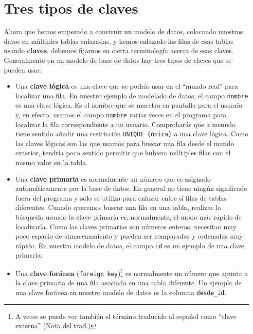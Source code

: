 \section{Tres tipos de claves}

Ahora que hemos empezado a construir un modelo de datos, colocando
nuestros datos en múltiples tablas enlazadas, y hemos enlazado las filas de esas
tablas usando {\bf claves}, debemos fijarnos en cierta terminología
acerca de esas claves. Generalmente en un modelo de base de datos hay
tres tipos de claves que se pueden usar:

\begin{itemize}

\item Una {\bf clave lógica} es una clave que se podría usar en el ``mundo real''
para localizar una fila. En nuestro ejemplo de modelado de datos, el campo
{\tt nombre} es una clave lógica. Es el nombre que se muestra en pantalla para el usuario
y, en efecto, usamos el campo {\tt nombre} varias veces en el programa
para localizar la fila correspondiente a un usuario. Comprobarás que a menudo tiene sentido
añadir una restricción {\tt UNIQUE (única)} a una clave lógica. Como las
claves lógicas son las que usamos para buscar una fila desde el mundo exterior, tendría
poco sentido permitir que hubiera múltiples filas con el mismo valor en la tabla.

\item Una {\bf clave primaria} es normalmente un número que es asignado
automáticamente por la base de datos. En general no tiene ningún significado fuera
del programa y sólo se utiliza para enlazar entre sí filas de tablas diferentes.
Cuando queremos buscar una fila en una tabla, realizar
la búsqueda usando la clave primaria es, normalmente, el modo
más rápido de localizarla. Como las claves primarias son números enteros,
necesitan muy poco espacio de almacenamiento y pueden ser comparadas y ordenadas muy rápido.
En nuestro modelo de datos, el campo {\tt id} es un ejemplo de una clave primaria.

\item Una {\bf clave foránea} ({\tt foreign key})\footnote{A veces se puede ver también
el término traducido al español como ``clave externa'' (Nota del trad.)}
es normalmente un número que apunta a la clave primaria
de una fila asociada en una tabla diferente. Un ejemplo de una clave foránea
en nuestro modelo de datos es la columna \verb"desde_id".

\end{itemize}

